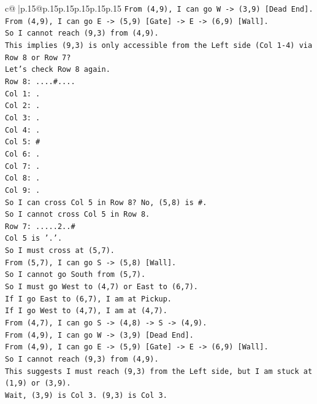 \documentclass{article}
\begin{document}
{\begin{supertabular}{c@{$\;$}|p{.15\linewidth}@{}p{.15\linewidth}p{.15\linewidth}p{.15\linewidth}p{.15\linewidth}p{.15\linewidth}}
{{{\texttt{From (4,9), I can go W {-}> (3,9) {[}Dead End{]}.} \\
\texttt{From (4,9), I can go E {-}> (5,9) {[}Gate{]} {-}> E {-}> (6,9) {[}Wall{]}.} \\
\texttt{So I cannot reach (9,3) from (4,9).} \\
\texttt{This implies (9,3) is only accessible from the Left side (Col 1{-}4) via Row 8 or Row 7?} \\
\texttt{Let's check Row 8 again.} \\
\texttt{Row 8: ....\#....} \\
\texttt{Col 1: .} \\
\texttt{Col 2: .} \\
\texttt{Col 3: .} \\
\texttt{Col 4: .} \\
\texttt{Col 5: \#} \\
\texttt{Col 6: .} \\
\texttt{Col 7: .} \\
\texttt{Col 8: .} \\
\texttt{Col 9: .} \\
\texttt{So I can cross Col 5 in Row 8? No, (5,8) is \#.} \\
\texttt{So I cannot cross Col 5 in Row 8.} \\
\texttt{Row 7: .....2..\#} \\
\texttt{Col 5 is '.'.} \\
\texttt{So I must cross at (5,7).} \\
\texttt{From (5,7), I can go S {-}> (5,8) {[}Wall{]}.} \\
\texttt{So I cannot go South from (5,7).} \\
\texttt{So I must go West to (4,7) or East to (6,7).} \\
\texttt{If I go East to (6,7), I am at Pickup.} \\
\texttt{If I go West to (4,7), I am at (4,7).} \\
\texttt{From (4,7), I can go S {-}> (4,8) {-}> S {-}> (4,9).} \\
\texttt{From (4,9), I can go W {-}> (3,9) {[}Dead End{]}.} \\
\texttt{From (4,9), I can go E {-}> (5,9) {[}Gate{]} {-}> E {-}> (6,9) {[}Wall{]}.} \\
\texttt{So I cannot reach (9,3) from (4,9).} \\
\texttt{This suggests I must reach (9,3) from the Left side, but I am stuck at (1,9) or (3,9).} \\
\texttt{Wait, (3,9) is Col 3. (9,3) is Col 3.} \\
}}}
\end{supertabular}}
\end{document}
